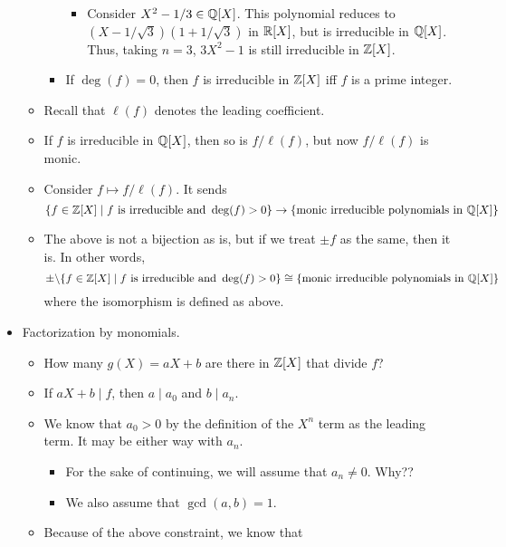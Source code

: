 \documentclass[../notes.tex]{subfiles}
\begin{document}
\begin{itemize}
\begin{itemize}
\begin{itemize}
\begin{itemize}
                \item Consider $X^2-1/3\in\mathbb{Q}[X]$. This polynomial reduces to $(X-1/\sqrt{3})(1+1/\sqrt{3})$ in $\mathbb{R}[X]$, but is irreducible in $\mathbb{Q}[X]$. Thus, taking $n=3$, $3X^2-1$ is still irreducible in $\mathbb{Z}[X]$.
            \end{itemize}
            \item If $\deg(f)=0$, then $f$ is irreducible in $\mathbb{Z}[X]$ iff $f$ is a prime integer.
        \end{itemize}
        \item Recall that $\ell(f)$ denotes the leading coefficient.
        \item If $f$ is irreducible in $\mathbb{Q}[X]$, then so is $f/\ell(f)$, but now $f/\ell(f)$ is monic.
        \item Consider $f\mapsto f/\ell(f)$. It sends
        \begin{equation*}
            \{f\in\mathbb{Z}[X]\mid f\text{ is irreducible and }\deg(f)>0\} \to \{\text{monic irreducible polynomials in }\mathbb{Q}[X]\}
        \end{equation*}
        \item The above is not a bijection as is, but if we treat $\pm f$ as the same, then it is. In other words,
        \begin{equation*}
            \pm\backslash\{f\in\mathbb{Z}[X]\mid f\text{ is irreducible and }\deg(f)>0\} \cong \{\text{monic irreducible polynomials in }\mathbb{Q}[X]\}
        \end{equation*}
        where the isomorphism is defined as above.
    \end{itemize}
    \item Factorization by monomials.
    \begin{itemize}
        \item How many $g(X)=aX+b$ are there in $\mathbb{Z}[X]$ that divide $f$?
        \item If $aX+b\mid f$, then $a\mid a_0$ and $b\mid a_n$.
        \item We know that $a_0>0$ by the definition of the $X^n$ term as the leading term. It may be either way with $a_n$.
        \begin{itemize}
            \item For the sake of continuing, we will assume that $a_n\neq 0$. Why??
            \item We also assume that $\gcd(a,b)=1$.
        \end{itemize}
        \item Because of the above constraint, we know that

\end{itemize}
\end{itemize}
\end{document}
